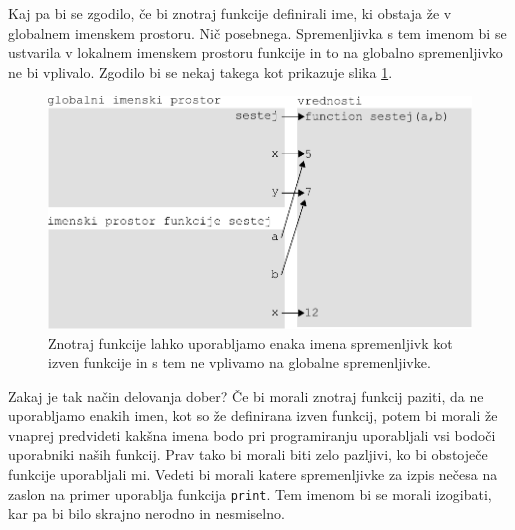 Kaj pa bi se zgodilo, če bi znotraj funkcije definirali ime, ki obstaja že v globalnem imenskem prostoru. Nič posebnega. Spremenljivka s tem imenom bi se ustvarila v lokalnem imenskem prostoru funkcije in to na globalno spremenljivko ne bi vplivalo. Zgodilo bi se nekaj takega kot prikazuje slika \ref{img:imenski_prostor_5}.
\begin{figure}
    \centering
    \includegraphics[width=\linewidth]{img/imenski_prostor_5.pdf}
    \caption{Znotraj funkcije lahko uporabljamo enaka imena spremenljivk kot izven funkcije in s tem ne vplivamo na globalne spremenljivke.}
    \label{img:imenski_prostor_5}
\end{figure}
Zakaj je tak način delovanja dober? Če bi morali znotraj funkcij paziti, da ne uporabljamo enakih imen, kot so že definirana izven funkcij, potem bi morali že vnaprej predvideti kakšna imena bodo pri programiranju uporabljali vsi bodoči uporabniki naših funkcij. Prav tako bi morali biti zelo pazljivi, ko bi obstoječe funkcije uporabljali mi. Vedeti bi morali katere spremenljivke za izpis nečesa na zaslon na primer uporablja funkcija \texttt{print}. Tem imenom bi se morali izogibati, kar pa bi bilo skrajno nerodno in nesmiselno.

